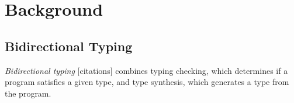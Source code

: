 \section{Background}
\label{sec:Background}

\subsection{Bidirectional Typing}
\emph{Bidirectional typing} [citations] combines typing checking, which determines if a program
satisfies a given type, and type synthesis, which generates a type from the program.
